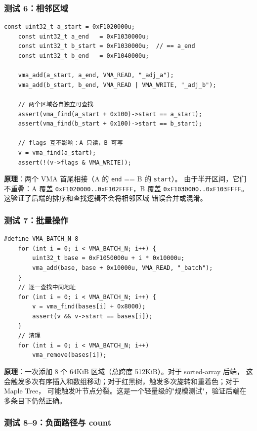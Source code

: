 \subsubsection{测试 6：相邻区域}

\begin{lstlisting}[style=cstyle]
    const uint32_t a_start = 0xF1020000u;
    const uint32_t a_end   = 0xF1030000u;
    const uint32_t b_start = 0xF1030000u;  // == a_end
    const uint32_t b_end   = 0xF1040000u;

    vma_add(a_start, a_end, VMA_READ, "_adj_a");
    vma_add(b_start, b_end, VMA_READ | VMA_WRITE, "_adj_b");

    // 两个区域各自独立可查找
    assert(vma_find(a_start + 0x100)->start == a_start);
    assert(vma_find(b_start + 0x100)->start == b_start);

    // flags 互不影响：A 只读，B 可写
    v = vma_find(a_start);
    assert(!(v->flags & VMA_WRITE));
\end{lstlisting}

\textbf{原理}：两个 VMA 首尾相接（A 的 \texttt{end} == B 的 \texttt{start}）。
由于半开区间，它们不重叠：A 覆盖 \texttt{0xF1020000..0xF102FFFF}，B 覆盖
\texttt{0xF1030000..0xF103FFFF}。这验证了后端的排序和查找逻辑不会将相邻区域
错误合并或混淆。

\subsubsection{测试 7：批量操作}

\begin{lstlisting}[style=cstyle]
    #define VMA_BATCH_N 8
    for (int i = 0; i < VMA_BATCH_N; i++) {
        uint32_t base = 0xF1050000u + i * 0x10000u;
        vma_add(base, base + 0x10000u, VMA_READ, "_batch");
    }
    // 逐一查找中间地址
    for (int i = 0; i < VMA_BATCH_N; i++) {
        v = vma_find(bases[i] + 0x8000);
        assert(v && v->start == bases[i]);
    }
    // 清理
    for (int i = 0; i < VMA_BATCH_N; i++)
        vma_remove(bases[i]);
\end{lstlisting}

\textbf{原理}：一次添加 8 个 64KiB 区域（总跨度 512KiB）。对于 sorted-array 后端，
这会触发多次有序插入和数组移动；对于红黑树，触发多次旋转和重着色；对于 Maple Tree，
可能触发叶节点分裂。这是一个轻量级的"规模测试"，验证后端在多条目下仍然正确。

\subsubsection{测试 8--9：负面路径与 count}

